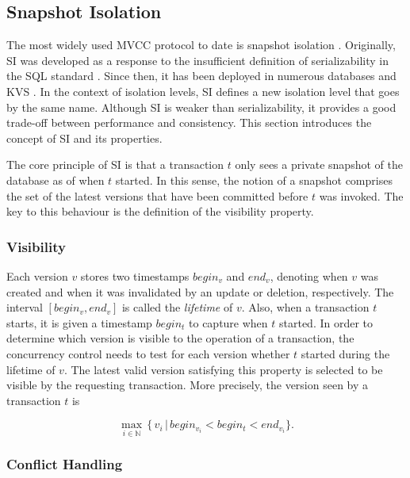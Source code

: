 \subsection{Snapshot Isolation}

The most widely used MVCC protocol to date is snapshot isolation
\cite{larson2011high, neumann2015fast}. Originally, SI was developed as a
response to the insufficient definition of serializability in the SQL standard
\cite{berenson1995critique}. Since then, it has been deployed in numerous
databases and KVS \cite{cahill2009serializable, wu2017empirical}. In the context
of isolation levels, SI defines a new isolation level that goes by the same
name. Although SI is weaker than serializability, it provides a good trade-off
between performance and consistency. This section introduces the concept of SI
and its properties.

The core principle of SI is that a transaction $t$ only sees a private snapshot
of the database as of when $t$ started. In this sense, the notion of a snapshot
comprises the set of the latest versions that have been committed before $t$ was
invoked. The key to this behaviour is the definition of the visibility property.

\subsubsection{Visibility}

Each version $v$ stores two timestamps $begin_v$ and $end_v$, denoting when $v$
was created and when it was invalidated by an update or deletion, respectively.
The interval $[begin_v,  end_v]$ is called the \emph{lifetime} of $v$. Also,
when a transaction $t$ starts, it is given a timestamp $begin_t$ to capture when
$t$ started. In order to determine which version is visible to the operation of
a transaction, the concurrency control needs to test for each version whether
$t$ started during the lifetime of $v$. The latest valid version satisfying this
property is selected to be visible by the requesting transaction. More
precisely, the version seen by a transaction $t$ is

\[
\operatorname*{max}_{i \in \mathbb{N}}\, \{\, v_i\, |\, begin_{v_i} < begin_t < end_{v_i}\}.
\]

\subsubsection{Conflict Handling}

